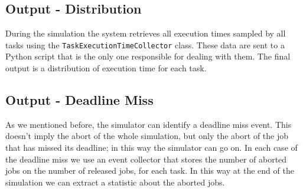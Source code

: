 \subsection{Output - Distribution}
During the simulation the system retrieves all execution times sampled by all tasks using the \texttt{TaskExecutionTimeCollector} class. These data are sent to a Python script that is the only one responsible for dealing with them. The final output is a distribution of execution time for each task.

\subsection{Output - Deadline Miss}
As we mentioned before, the simulator can identify a deadline miss event. This doesn't imply the abort of the whole simulation, but only the abort of the job that has missed its deadline; in this way the simulator can go on. In each case of the deadline miss we use an event collector that stores the number of aborted jobs on the number of released jobs, for each task. In this way at the end of the simulation we can extract a statistic about the aborted jobs.

